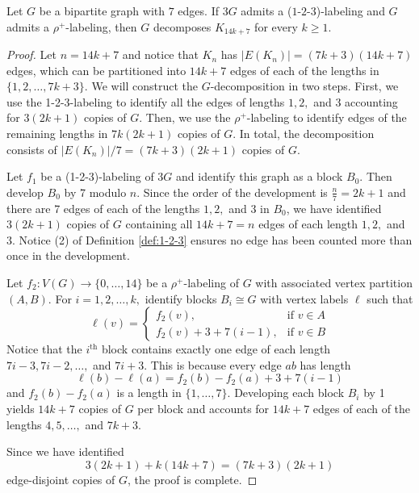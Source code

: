 \documentclass{dmgt}
\begin{document}
\begin{theorem}\label{thm:1-2-3 plus rho}
    Let $G$ be a bipartite graph with $7$ edges. If $3G$ admits a ($1$-$2$-$3$)-labeling and $G$ admits a $\rho^{+}$-labeling, then $G$ decomposes $K_{14k+7}$ for every $k\geq1.$
\end{theorem}
\begin{proof}
    Let $n=14k+7$ and notice that $K_n$ has $|E(K_n)|=(7k+3)(14k+7)$ edges, which can be partitioned into $14k+7$ edges of each of the lengths in $\{1,2,\dots,7k+3\}.$  We will construct the $G$-decomposition in two steps. First, we use the 1-2-3-labeling to identify all the edges of lengths $1,2,$ and $3$ accounting for $3(2k+1)$ copies of $G$. Then, we use the $\rho^{+}$-labeling to identify edges of the remaining lengths in $7k(2k+1)$ copies of $G$. In total, the decomposition consists of $|E(K_n)|/7=(7k+3)(2k+1)$ copies of $G.$

    Let $f_1$ be a (1-2-3)-labeling of $3G$ and identify this graph as a block $B_0$. Then develop $B_0$ by 7 modulo $n$. Since the order of the development is $\frac{n}{7}=2k+1$ and there are 7 edges of each of the lengths $1,2,$ and $3$ in $B_0$, we have identified $3(2k+1)$ copies of $G$ containing all $14k+7=n$ edges of each length $1,2,$ and $3$. Notice (2) of Definition \ref{def:1-2-3} ensures no edge has been counted more than once in the development.

    Let $f_2:V(G) \rightarrow \{0,\dots,14\}$ be a $\rho^{+}$-labeling of $G$ with associated vertex partition $(A,B).$ For $i=1,2,\dots,k,$ identify blocks $B_i \cong G$ with vertex labels $\ell$ such that
    \[
    \ell(v)=
    \begin{cases}
        f_2(v), & \textrm{if } v \in A \\
        f_2(v)+3+7(i-1), & \textrm{if } v \in B
    \end{cases}
    \]
    Notice that the $i^{\textrm{th}}$ block contains exactly one edge of each length $7i-3,7i-2, \dots,$ and $ 7i+3.$ This is because every edge $ab$ has length 
    \[
    \ell(b)-\ell(a)=f_2(b)-f_2(a)+3+7(i-1)
    \]
    and $f_2(b)-f_2(a)$ is a length in $\{1,\dots,7\}.$
    Developing each block $B_i$ by 1 yields $14k+7$ copies of $G$ per block and accounts for $14k+7$ edges of each of the lengths $4,5,\dots,$ and $7k+3$.

    Since we have identified
    \[
    3(2k+1)+k(14k+7)=(7k+3)(2k+1)
    \]
    edge-disjoint copies of $G$, the proof is complete.
\end{proof}
\end{document}
